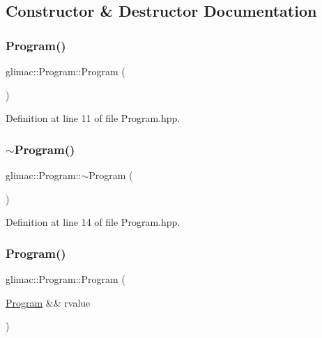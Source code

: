 \subsection{Constructor \& Destructor Documentation}
\mbox{\label{classglimac_1_1_program_ae364a0bdec2fee9c5d8a6bb617d1a4f4}} 
\subsubsection{\texorpdfstring{Program()}{Program()}\hspace{0.1cm}{\footnotesize\ttfamily [1/2]}}
{\footnotesize\ttfamily glimac\+::\+Program\+::\+Program (\begin{DoxyParamCaption}{ }\end{DoxyParamCaption})\hspace{0.3cm}{\ttfamily [inline]}}



Definition at line 11 of file Program.\+hpp.

\mbox{\label{classglimac_1_1_program_ad1b5de1578ad33a3b8ea127ca9f16b68}} 
\subsubsection{\texorpdfstring{$\sim$\+Program()}{~Program()}}
{\footnotesize\ttfamily glimac\+::\+Program\+::$\sim$\+Program (\begin{DoxyParamCaption}{ }\end{DoxyParamCaption})\hspace{0.3cm}{\ttfamily [inline]}}



Definition at line 14 of file Program.\+hpp.

\mbox{\label{classglimac_1_1_program_aad59ed1f53824eda09b95fd1acdce674}} 
\subsubsection{\texorpdfstring{Program()}{Program()}\hspace{0.1cm}{\footnotesize\ttfamily [2/2]}}
{\footnotesize\ttfamily glimac\+::\+Program\+::\+Program (\begin{DoxyParamCaption}\item[{\hyperlink{classglimac_1_1_program}{Program} \&\&}]{rvalue }\end{DoxyParamCaption})\hspace{0.3cm}{\ttfamily [inline]}}



